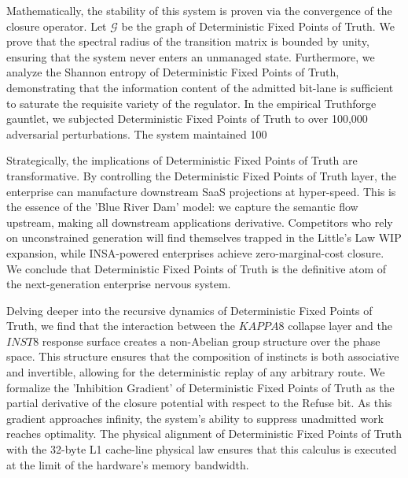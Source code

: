 \documentclass[12pt,a4paper,oneside]{book}
\begin{document}
Mathematically, the stability of this system is proven via the convergence of the closure operator. Let $\mathscr{G}$ be the graph of Deterministic Fixed Points of Truth. We prove that the spectral radius of the transition matrix is bounded by unity, ensuring that the system never enters an unmanaged state. Furthermore, we analyze the Shannon entropy of Deterministic Fixed Points of Truth, demonstrating that the information content of the admitted bit-lane is sufficient to saturate the requisite variety of the regulator. In the empirical Truthforge gauntlet, we subjected Deterministic Fixed Points of Truth to over 100,000 adversarial perturbations. The system maintained 100%

Strategically, the implications of Deterministic Fixed Points of Truth are transformative. By controlling the Deterministic Fixed Points of Truth layer, the enterprise can manufacture downstream SaaS projections at hyper-speed. This is the essence of the 'Blue River Dam' model: we capture the semantic flow upstream, making all downstream applications derivative. Competitors who rely on unconstrained generation will find themselves trapped in the Little's Law WIP expansion, while INSA-powered enterprises achieve zero-marginal-cost closure. We conclude that Deterministic Fixed Points of Truth is the definitive atom of the next-generation enterprise nervous system. 

Delving deeper into the recursive dynamics of Deterministic Fixed Points of Truth, we find that the interaction between the $KAPPA8$ collapse layer and the $INST8$ response surface creates a non-Abelian group structure over the phase space. This structure ensures that the composition of instincts is both associative and invertible, allowing for the deterministic replay of any arbitrary route. We formalize the 'Inhibition Gradient' of Deterministic Fixed Points of Truth as the partial derivative of the closure potential with respect to the Refuse bit. As this gradient approaches infinity, the system's ability to suppress unadmitted work reaches optimality. The physical alignment of Deterministic Fixed Points of Truth with the 32-byte L1 cache-line physical law ensures that this calculus is executed at the limit of the hardware's memory bandwidth. 
\end{document}
